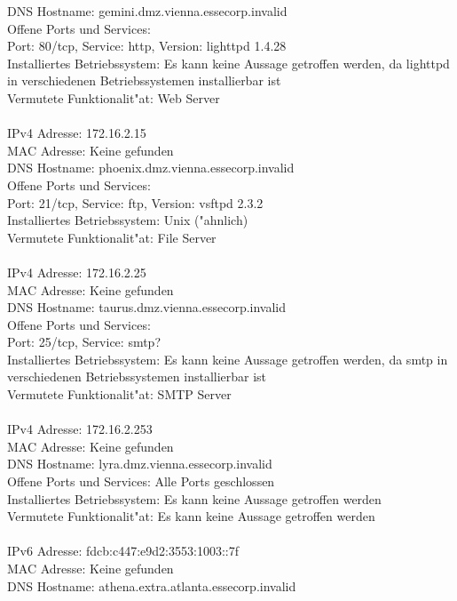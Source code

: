 \documentclass[12pt,a4paper,titlepage,oneside]{scrartcl}
\begin{document}
DNS Hostname: gemini.dmz.vienna.essecorp.invalid\\
Offene Ports und Services:\\
Port: 80/tcp, Service: http, Version: lighttpd 1.4.28\\
Installiertes Betriebssystem: Es kann keine Aussage getroffen werden, da lighttpd in verschiedenen Betriebssystemen installierbar ist\\
Vermutete Funktionalit"at: Web Server\\
\\
IPv4 Adresse: 172.16.2.15\\
MAC Adresse: Keine gefunden\\
DNS Hostname: phoenix.dmz.vienna.essecorp.invalid\\
Offene Ports und Services:\\
Port: 21/tcp, Service: ftp, Version: vsftpd 2.3.2\\
Installiertes Betriebssystem: Unix ("ahnlich)\\
Vermutete Funktionalit"at: File Server\\
\\
IPv4 Adresse: 172.16.2.25\\
MAC Adresse: Keine gefunden\\
DNS Hostname: taurus.dmz.vienna.essecorp.invalid\\
Offene Ports und Services:\\
Port: 25/tcp, Service: smtp?\\
Installiertes Betriebssystem: Es kann keine Aussage getroffen werden, da smtp in verschiedenen Betriebssystemen installierbar ist\\
Vermutete Funktionalit"at: SMTP Server\\
\\
IPv4 Adresse: 172.16.2.253\\
MAC Adresse: Keine gefunden\\
DNS Hostname: lyra.dmz.vienna.essecorp.invalid\\
Offene Ports und Services: Alle Ports geschlossen\\
Installiertes Betriebssystem: Es kann keine Aussage getroffen werden\\
Vermutete Funktionalit"at: Es kann keine Aussage getroffen werden\\
\\
IPv6 Adresse: fdcb:c447:e9d2:3553:1003::7f\\
MAC Adresse: Keine gefunden\\
DNS Hostname: athena.extra.atlanta.essecorp.invalid\\
\end{document}

